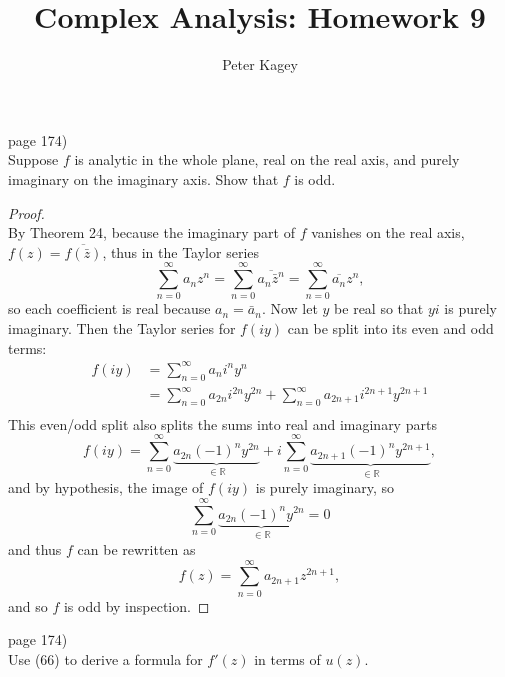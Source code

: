 \documentclass{article}
\newenvironment{problem}[2][Problem]{\begin{trivlist}
\item[\hskip \labelsep {\bfseries #1}\hskip \labelsep {\bfseries #2.}]}{\end{trivlist}}
\begin{document}
\title{Complex Analysis: Homework 9}
\author{Peter Kagey}

\maketitle

\begin{problem}{1} (page 174) \\
  Suppose $f$ is analytic in the whole plane, real on the real axis, and purely
  imaginary on the imaginary axis. Show that $f$ is odd.
\end{problem}
\begin{proof} \text{} \\
  By Theorem 24, because the imaginary part of $f$ vanishes on the real axis,
  $f(z) = \overline{f(\bar{z})}$, thus in the Taylor series \[
    \sum_{n = 0}^\infty a_n z^n
    = \sum_{n = 0}^\infty \overline{a_n \bar{z}^n}
    = \sum_{n = 0}^\infty \overline{a_n} z^n,
  \] so each coefficient is real because $a_n = \bar{a}_n$.
  Now let $y$ be real so that $yi$ is purely imaginary. Then the Taylor series
  for $f(iy)$ can be split into its even and odd terms: \begin{align*}
    f(iy) &= \sum_{n = 0}^\infty a_n i^n y^n \\
          &= \sum_{n = 0}^\infty a_{2n} i^{2n} y^{2n}
            + \sum_{n = 0}^\infty a_{2n+1} i^{2n+1} y^{2n+1} \\
  \end{align*}
  This even/odd split also splits the sums into real and imaginary parts \[
    f(iy)= \sum_{n = 0}^\infty \underbrace{a_{2n} (-1)^n y^{2n}}_{\in \mathbb{R}}
      + i\sum_{n = 0}^\infty \underbrace{a_{2n+1} (-1)^n y^{2n+1}}_{\in \mathbb{R}},
  \] and by hypothesis, the image of $f(iy)$ is purely imaginary, so \[
    \sum_{n = 0}^\infty \underbrace{a_{2n} (-1)^n y^{2n}}_{\in \mathbb{R}} = 0
  \] and thus $f$ can be rewritten as \[
    f(z) = \sum_{n = 0}^\infty a_{2n+1} z^{2n+1},
  \] and so $f$ is odd by inspection.
\end{proof}
\pagebreak

\begin{problem}{4} (page 174) \\
  Use (66) to derive a formula for $f'(z)$ in terms of $u(z)$.
\end{problem}
\end{document}
